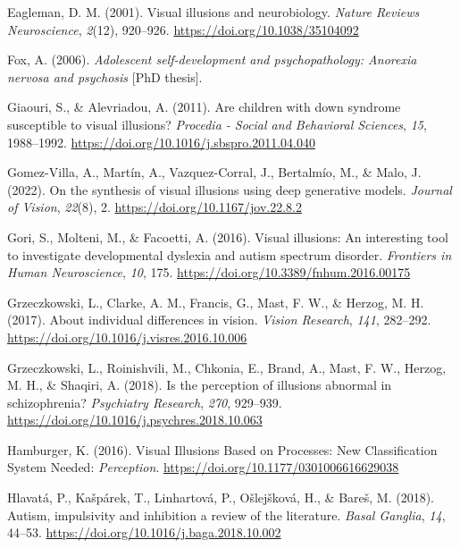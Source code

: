 \documentclass[
  man,floatsintext]{apa6}
\newlength{\cslhangindent}
\newlength{\cslentryspacingunit} %
\newenvironment{CSLReferences}[2] %
 {%
  \setlength{\parindent}{0pt}
  \ifodd #1
  \let\oldpar\par
  \def\par{\hangindent=\cslhangindent\oldpar}
  \fi
  \setlength{\parskip}{#2\cslentryspacingunit}
 }%
 {}
\begin{document}
\begin{CSLReferences}{1}{0}
\leavevmode{}%
Eagleman, D. M. (2001). Visual illusions and neurobiology. \emph{Nature Reviews Neuroscience}, \emph{2}(12), 920--926. \url{https://doi.org/10.1038/35104092}

\leavevmode{}%
Fox, A. (2006). \emph{Adolescent self-development and psychopathology: Anorexia nervosa and psychosis} {[}PhD thesis{]}.

\leavevmode{}%
Giaouri, S., \& Alevriadou, A. (2011). Are children with down syndrome susceptible to visual illusions? \emph{Procedia - Social and Behavioral Sciences}, \emph{15}, 1988--1992. \url{https://doi.org/10.1016/j.sbspro.2011.04.040}

\leavevmode{}%
Gomez-Villa, A., Martín, A., Vazquez-Corral, J., Bertalmío, M., \& Malo, J. (2022). On the synthesis of visual illusions using deep generative models. \emph{Journal of Vision}, \emph{22}(8), 2. \url{https://doi.org/10.1167/jov.22.8.2}

\leavevmode{}%
Gori, S., Molteni, M., \& Facoetti, A. (2016). Visual illusions: An interesting tool to investigate developmental dyslexia and autism spectrum disorder. \emph{Frontiers in Human Neuroscience}, \emph{10}, 175. \url{https://doi.org/10.3389/fnhum.2016.00175}

\leavevmode{}%
Grzeczkowski, L., Clarke, A. M., Francis, G., Mast, F. W., \& Herzog, M. H. (2017). About individual differences in vision. \emph{Vision Research}, \emph{141}, 282--292. \url{https://doi.org/10.1016/j.visres.2016.10.006}

\leavevmode{}%
Grzeczkowski, L., Roinishvili, M., Chkonia, E., Brand, A., Mast, F. W., Herzog, M. H., \& Shaqiri, A. (2018). Is the perception of illusions abnormal in schizophrenia? \emph{Psychiatry Research}, \emph{270}, 929--939. \url{https://doi.org/10.1016/j.psychres.2018.10.063}

\leavevmode{}%
Hamburger, K. (2016). Visual Illusions Based on Processes: New Classification System Needed: \emph{Perception}. \url{https://doi.org/10.1177/0301006616629038}

\leavevmode{}%
Hlavatá, P., Kašpárek, T., Linhartová, P., Ošlejšková, H., \& Bareš, M. (2018). Autism, impulsivity and inhibition a review of the literature. \emph{Basal Ganglia}, \emph{14}, 44--53. \url{https://doi.org/10.1016/j.baga.2018.10.002}


\end{CSLReferences}
\end{document}
